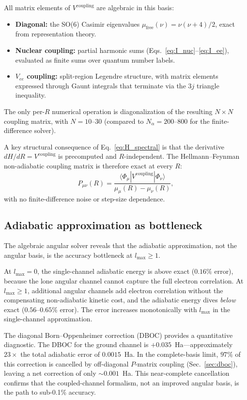 \documentclass[aps,pra,twocolumn,superscriptaddress,longbibliography]{revtex4-2}
\begin{document}
All matrix elements of $V^{\mathrm{coupling}}$ are algebraic in this
basis:
\begin{itemize}
  \item \textbf{Diagonal:} the SO(6) Casimir eigenvalues
    $\mu_{\mathrm{free}}(\nu) = \nu(\nu+4)/2$, exact from
    representation theory.
  \item \textbf{Nuclear coupling:} partial harmonic sums
    (Eqs.~\ref{eq:I_nuc}--\ref{eq:I_ee}), evaluated as finite sums
    over quantum number labels.
  \item \textbf{$V_{ee}$ coupling:} split-region Legendre structure,
    with matrix elements expressed through Gaunt integrals that
    terminate via the $3j$ triangle inequality.
\end{itemize}
The only per-$R$ numerical operation is diagonalization of the
resulting $N \times N$ coupling matrix, with $N = 10$--$30$
(compared to $N_\alpha = 200$--$800$ for the finite-difference solver).

A key structural consequence of Eq.~\eqref{eq:H_spectral} is that
the derivative $dH/dR = V^{\mathrm{coupling}}$ is precomputed and
$R$-independent.  The Hellmann--Feynman non-adiabatic coupling
matrix is therefore exact at every $R$:
\begin{equation}
  P_{\mu\nu}(R) = \frac{\langle\Phi_\mu|V^{\mathrm{coupling}}|\Phi_\nu\rangle}
  {\mu_\mu(R) - \mu_\nu(R)},
  \label{eq:P_hellmann_feynman}
\end{equation}
with no finite-difference noise or step-size dependence.

\subsection{Adiabatic approximation as bottleneck}
\label{sec:adiabatic_bottleneck}

The algebraic angular solver reveals that the adiabatic approximation,
not the angular basis, is the accuracy bottleneck at $l_{\max} \ge 1$.

At $l_{\max} = 0$, the single-channel adiabatic energy is above
exact ($0.16\%$ error), because the lone angular channel cannot
capture the full electron correlation.  At $l_{\max} \ge 1$,
additional angular channels add electron correlation without the
compensating non-adiabatic kinetic cost, and the adiabatic energy
dives \emph{below} exact ($0.56$--$0.65\%$ error).  The error
increases monotonically with $l_{\max}$ in the single-channel
approximation.

The diagonal Born--Oppenheimer correction (DBOC) provides a
quantitative diagnostic.  The DBOC for the ground channel is
$+0.035$~Ha---approximately $23\times$ the total adiabatic error
of $0.0015$~Ha.  In the complete-basis limit, $97\%$ of this
correction is cancelled by off-diagonal $P$-matrix coupling
(Sec.~\ref{sec:dboc}), leaving a net correction of only
$\sim 0.001$~Ha.  This near-complete cancellation confirms that
the coupled-channel formalism, not an improved angular basis,
is the path to sub-0.1\% accuracy.
\end{document}
